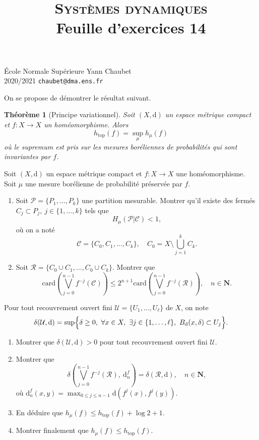 \documentclass[a4paper,12pt,openany]{article}
\title{\textsc{Syst\`emes dynamiques} \\ Feuille d'exercices 14}
\date{}
\author{}
\theoremstyle{plain}
\newtheorem*{thm*}{Th\'eor\`eme}
\theoremstyle{definition}
\newcommand{\dd}{\mathrm{d}}
\newcommand{\N}{\mathbf{N}}
\begin{document}
{\noindent \'Ecole Normale Sup\'erieure  \hfill Yann Chaubet } \\
{2020/2021 \hfill \texttt{chaubet@dma.ens.fr}}

{\let\newpage\relax\maketitle}
\maketitle


{\noindent On se propose de d\'emontrer le r\'esultat suivant.

\begin{thm*}[Principe variationnel]
Soit $(X, \dd)$ un espace m\'etrique compact et $f : X \to X$ un hom\'eomorphisme. Alors 
$$
h_\mathrm{top}(f) = \sup_\mu h_\mu(f)
$$
o\`u le supremum est pris sur les mesures bor\'eliennes de probabilit\'es qui sont invariantes par $f$.
\end{thm*}
 }
 \vspace{0.6cm}

 \vspace{1.5mm}

\noindent Soit $(X, \dd)$ un espace m\'etrique compact et $f : X \to X$ une hom\'eomorphisme. Soit $\mu$ une mesure bor\'elienne de probabilit\'e pr\'eserv\'ee par $f$. 

\begin{enumerate}
\item Soit $\mathcal{P} = \{P_1, \dots, P_k\}$ une partition mesurable. Montrer qu'il existe des ferm\'es $C_j \subset P_j,~j \in \{1,\dots,k\}$ tels que
$$
H_\mu(\mathcal{P}| \mathcal{C}) < 1,
$$
o\`u on a not\'e
$$
\mathcal{C} = \{C_0, C_1, \dots, C_k\}, \quad C_0 = X \setminus \bigcup_{j=1}^k C_k.
$$
\item Soit $\mathcal{R} = \{C_0 \cup C_1, \dots, C_0 \cup C_k\}$. Montrer que 
$$
\mathrm{card}\left( \bigvee_{j=0}^{n-1} f^{-j}(\mathcal{C})\right) \leq 2^{n+1} \mathrm{card}\left(\bigvee_{j=0}^{n-1} f^{-j}(\mathcal{R})\right), \quad n \in \N.
$$
\end{enumerate}
Pour tout recouvrement ouvert fini $\mathcal{U} = \{U_1, \dots, U_\ell\}$ de $X$, on note
$$
\delta(\mathcal{U}, \dd) = \sup \Bigl\{ \delta \geq 0,~\forall x \in X,~\exists j \in \{1, \dots, \ell\},~B_\dd(x, \delta) \subset U_j \Bigr\}. 
$$
\begin{enumerate}[resume]
\item Montrer que $\delta(\mathcal{U}, \dd) > 0$ pour tout recouvrement ouvert fini $\mathcal{U}$.
\item Montrer que
$$
\delta\left(\bigvee_{j=0}^{n-1} f^{-j}(\mathcal{R}),~ \dd_n^f\right) = \delta(\mathcal{R}, \dd), \quad n \in \N,
$$
o\`u $\dd_n^f(x,y) = \max_{0 \leq j \leq n-1} \dd(f^j(x), f^j(y))$.
\item En d\'eduire que $h_\mu(f) \leq h_\mathrm{top}(f) + \log 2 + 1$.
\item Montrer finalement que $h_\mu(f) \leqslant h_\mathrm{top}(f).$
\end{enumerate}
\end{document}
